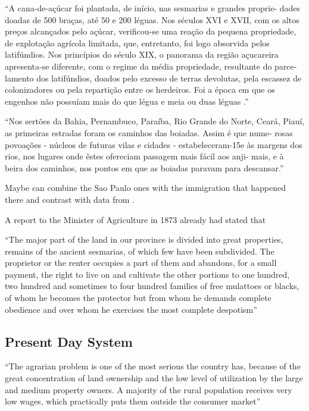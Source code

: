 \documentclass{article}
\begin{document}
``A  cana-de-açúcar foi  plantada,  de  início,  nas sesmarias  e  grandes  proprie- dades  doadas de  500  braças,  até  50  e  200  léguas.  Nos  séculos XVI  e  XVII,  com  os  altos  preços  alcançados  pelo  açúcar,  verificou-se  uma  reação  da  pequena  propriedade,  de  explotação agrícola  limitada,  que,  entretanto,  foi  logo  absorvida  pelos latifúndios. Nos  princípios  do  século  XIX, o panorama da região  açucareira  apresenta-se diferente,  com o  regime da média propriedade, resultante  do parce- lamento  dos  latifúndios,  doados  pelo  excesso  de  terras  devolutas,  pela  escassez  de  colonizadores  ou  pela  repartição  entre  os  herdeiros.  Foi  a  época  em  que  os  engenhos  não  possuíam  mais  do  que  légua  e  meia  ou  duas  léguas .''
\parencite[p.~118]{De_Geografia1970-nk}


``Nos  sertões  da  Bahia,  Pernambuco,  Paraíba,  Rio  Grande  do  Norte,  Ceará,  Piauí, as primeiras estradas foram os  caminhos das boiadas.  Assim  é  que nume- rosas  povoações  - núcleos  de  futuras  vilas  e  cidades  - estabeleceram-15e  às  margens dos rios,  nos lugares onde  êstes ofereciam passagem mais fácil  aos anji- mais,  e  à  beira  dos  caminhos,  nos  pontos  em  que  as  boiadas  paravam  para  descansar.''
\parencite[p.~164]{De_Geografia1970-nk}

\parencite{Panini1990-rj}

Maybe can combine the Sao Paulo ones with the immigration that happened there and contrast with data from \parencite{Rocha2017-yq}.

A report to the Minister of Agriculture in 1873 already had stated that \parencite[p.~324]{Smith1972-dv}

``The major part of the land in our province is divided into great properties, remains of the ancient sesmarias, of which few have been subdivided. The proprietor or the renter occupies a part of them and abandons, for a small payment, the right to live on and cultivate the other portions to one hundred, two hundred and sometimes to four hundred families of free mulattoes or blacks, of whom he becomes the protector but from whom he demands complete obedience and over whom he exercises the most complete despotism''\parencite[p.~325]{Smith1972-dv}

\subsection{Present Day System}

\textcite[p.~1]{De_Oliveira_Andrade1980-xz}
``The agrarian problem is one of the most serious the country has, because of the great concentration of land ownership and the low level of utilization by the large and medium property owners. A majority of the rural population receives very low wages, which practically puts them outside the consumer market''
\end{document}
